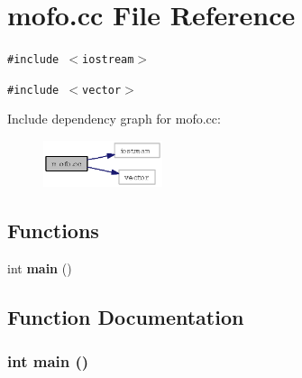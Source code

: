 \section{mofo.cc File Reference}
\label{mofo_8cc}
{\tt \#include $<$iostream$>$}\par
{\tt \#include $<$vector$>$}\par


Include dependency graph for mofo.cc:\begin{figure}[H]
\begin{center}
\leavevmode
\includegraphics[width=99pt]{mofo_8cc__incl}
\end{center}
\end{figure}
\subsection*{Functions}
\begin{CompactItemize}
\item 
int {\bf main} ()
\end{CompactItemize}


\subsection{Function Documentation}
\subsubsection{\setlength{\rightskip}{0pt plus 5cm}int main ()}\label{mofo_8cc_e66f6b31b5ad750f1fe042a706a4e3d4}


